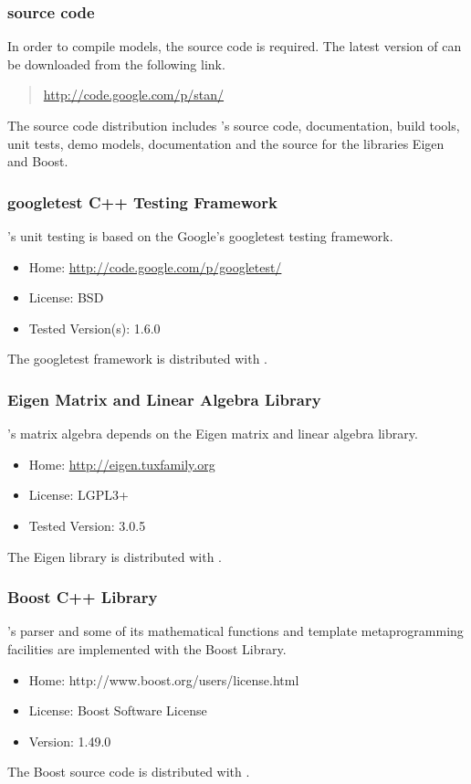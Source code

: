 \subsubsection{\Stan source code}

In order to compile \Stan models, the \Stan source code is required.
The latest version of \Stan can be downloaded from the following link.
%
\begin{quote}
\url{http://code.google.com/p/stan/}
\end{quote}
%
The \Stan source code distribution includes \Stan's source code,
documentation, build tools, unit tests, demo models, documentation and
the source for the libraries Eigen and Boost.

\subsubsection{googletest C++ Testing Framework}

\Stan's unit testing is based on the Google's googletest \Cpp testing
framework.  
%
\begin{itemize}
\item
Home: \url{http://code.google.com/p/googletest/}
\item
License: BSD
\item
Tested Version(s): 1.6.0
\end{itemize}
%
The googletest framework is distributed with \Stan.

\subsubsection{Eigen Matrix and Linear Algebra Library}

\Stan's matrix algebra depends on the Eigen \Cpp matrix and linear
algebra library.  
%
\begin{itemize}
\item Home: \url{http://eigen.tuxfamily.org}
\item License: LGPL3+
\item Tested Version: 3.0.5
\end{itemize}
%
The Eigen library is distributed with \Stan.

\subsubsection{Boost C++ Library}

\Stan's parser and some of its mathematical functions and 
template metaprogramming facilities are implemented with the Boost
\Cpp Library.  
%
\begin{itemize}
\item Home: http://www.boost.org/users/license.html
\item License: Boost Software License
\item Version: 1.49.0
\end{itemize}
%
The Boost source code is distributed with \Stan.

